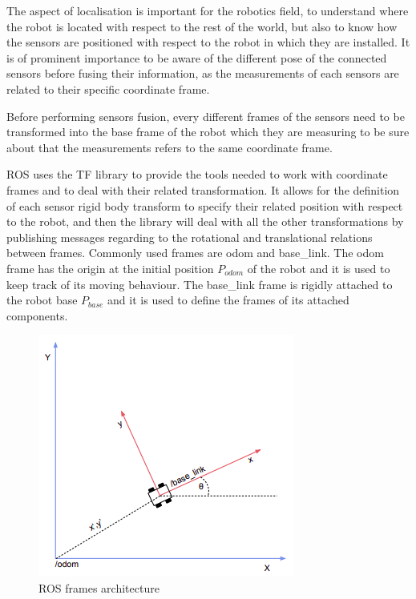 The aspect of localisation is important for the robotics field, to understand where the robot is located with respect to the rest of the world, but also to know how the sensors are positioned with respect to the robot in which they are installed.
It is of prominent importance to be aware of the different pose of the connected sensors before fusing their information, as the measurements of each sensors are related to their specific coordinate frame.

Before performing sensors fusion, every different frames of the sensors need to be transformed into the base frame of the robot which they are measuring to be sure about that the measurements refers to the same coordinate frame.

\Gls{ROS} uses the TF\cite{6556373} library to provide the tools needed to work with coordinate frames and to deal with their related transformation.
It allows for the definition of each sensor rigid body transform to specify their related position with respect to the robot, and then the library will deal with all the other transformations by publishing messages regarding to the rotational and translational relations between frames.
Commonly used frames are odom and base\_link. The odom frame has the origin at the initial position $P_{odom}$ of the robot and it is used to keep track of its moving behaviour. The base\_link frame is rigidly attached to the robot base $P_{base}$ and it is used to define the frames of its attached components.

\begin{figure}[!ht]
	\begin{center}
		\includegraphics[width=0.75\textwidth]{Images/2-Background/Frames-2021-04-22 12-03-22.png}
	\end{center}
	\caption{\Gls{ROS} frames architecture}%
	\label{fig:ros-frame}
\end{figure}



